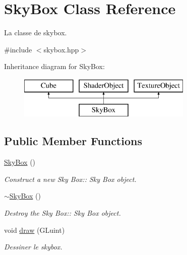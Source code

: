 \hypertarget{classSkyBox}{}\section{Sky\+Box Class Reference}
\label{classSkyBox}


La classe de skybox.  




{\ttfamily \#include $<$skybox.\+hpp$>$}

Inheritance diagram for Sky\+Box\+:\begin{figure}[H]
\begin{center}
\leavevmode
\includegraphics[height=2.000000cm]{classSkyBox}
\end{center}
\end{figure}
\subsection*{Public Member Functions}
\begin{DoxyCompactItemize}
\item 
\mbox{\hyperlink{classSkyBox_a548db645757da94296cb80402206dd3b}{Sky\+Box}} ()
\begin{DoxyCompactList}\small\item\em Construct a new Sky Box\+:\+: Sky Box object. \end{DoxyCompactList}\item 
\mbox{\hyperlink{classSkyBox_aef6a9b7d384358fd2095d1e171d8a997}{$\sim$\+Sky\+Box}} ()
\begin{DoxyCompactList}\small\item\em Destroy the Sky Box\+:\+: Sky Box object. \end{DoxyCompactList}\item 
void \mbox{\hyperlink{classSkyBox_ab4690616f1ceefd833d3ce68be01e50c}{draw}} (G\+Luint)
\begin{DoxyCompactList}\small\item\em Dessiner le skybox. \end{DoxyCompactList}\end{DoxyCompactItemize}
